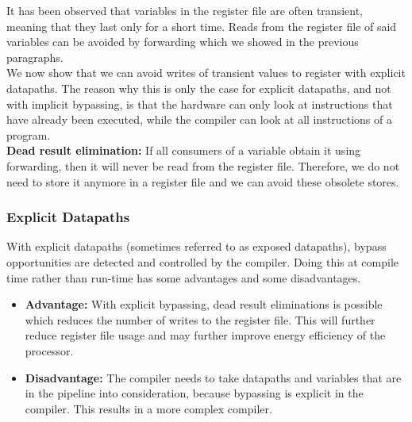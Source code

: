 It has been observed that variables in the register file are often transient, meaning that they last only for a short time.  Reads from the register file of said variables can be avoided by forwarding which we showed in the previous paragraphs.\\

We now show that we can avoid writes of transient values to register with explicit datapaths. The reason why this is only the case for explicit datapaths, and not with implicit bypassing, is that the hardware can only look at instructions that have already been executed, while the compiler can look at all instructions of a program.\\

\textbf{Dead result elimination:} 
If all consumers of a variable obtain it using forwarding, then it will never be read from the register file. Therefore, we do not need to store it anymore in a register file and we can avoid these obsolete stores.  

\subsubsection{Explicit Datapaths}
With explicit datapaths (sometimes referred to as exposed datapaths), bypass opportunities are detected and controlled by the compiler. Doing this at compile time rather than run-time has some advantages and some disadvantages.
\begin{itemize}
  \item\textbf{Advantage:}
    With explicit bypassing, dead result eliminations is possible which reduces the number of writes to the register file. This will further reduce register file usage and may further improve energy efficiency of the processor.
  \item\textbf{Disadvantage:}
    The compiler needs to take datapaths and variables that are in the pipeline into consideration, because bypassing is explicit in the compiler. This results in a more complex compiler.
\end{itemize}

